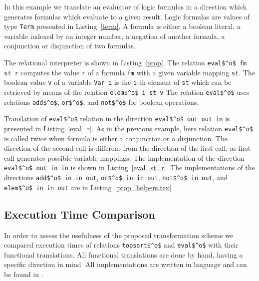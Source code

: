 

In this example we translate an evaluator of logic formulas in a direction which generates formulas which evaluate to a given result.
Logic formulas are values of type \lstinline{Term} presented in Listing~\ref{term}.
A formula is either a boolean literal, a variable indexed by an integer number, a negation of another formula, a conjunction or disjunction of two formulas.

The relational interpreter is shown in Listing~\ref{prop}.
The relation \lstinline{eval$^o$ fm st r} computes the value \lstinline{r} of a formula \lstinline{fm} with a given variable mapping \lstinline{st}.
The boolean value \lstinline{v} of a variable \lstinline{Var i} is the \lstinline{i}-th element of \lstinline{st} which can be retrieved by means of the relation \lstinline{elem$^o$ i st v}
The relation \lstinline{eval$^o$} uses relations \lstinline{add$^o$}, \lstinline{or$^o$}, and \lstinline{not$^o$} for boolean operations.

Translation of \lstinline{eval$^o$} relation in the direction \lstinline{eval$^o$ out out in} is presented in Listing~\ref{eval_r}.
As in the previous example, here relation \lstinline{eval$^o$} is called twice when formula is either a conjunction or a disjunction.
The direction of the second call is different from the direction of the first call, as first call generates possible variable mappings.
The implementation of the direction \lstinline{eval$^o$ out in in} is shown in Listing~\ref{eval_st_r}.
The implementations of the directions \lstinline{add$^o$ in in out}, \lstinline{or$^o$ in in out}, \lstinline{not$^o$ in out}, and \lstinline{elem$^o$ in in out} are in Listing~\ref{prop_helpers.tex}







\subsection{Execution Time Comparison}

In order to assess the usefulness of the proposed transformation scheme we compared execution times of \mk relations \lstinline{topsort$^o$} and \lstinline{eval$^o$} with their functional translations.
All functional translations are done by hand, having a specific direction in mind.
All implementations are written in \ocaml language and can be found in .

